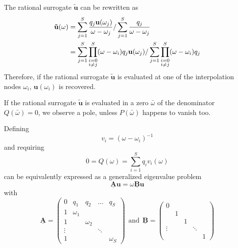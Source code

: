 \documentclass[11pt, a4paper]{article}
\begin{document}
The rational surrogate $\mathbf{\tilde{u}}$ can be rewritten as 
\begin{align}
    \mathbf{\tilde{u}}(\omega)
    &= \sum_{j=1}^S \frac{q_j \mathbf{u}(\omega_j)}{\omega - \omega_j}
    / \sum_{j=1}^S \frac{q_j}{\omega - \omega_j} \notag \\
    &= \sum_{j=1}^S \prod_{\substack{i=0 \\ i \neq j}}^S (\omega - \omega_i) q_j \mathbf{u}(\omega_j)
    / \sum_{j=1}^S \prod_{\substack{i=0 \\ i \neq j}}^S (\omega - \omega_i) q_j
\end{align}
Therefore, if the rational surrogate $\mathbf{\tilde{u}}$ is evaluated at one of the
interpolation nodes $\omega_i$, $\mathbf{u}(\omega_i)$ is recovered.

If the rational surrogate $\mathbf{\tilde{u}}$ is evaluated in a zero
$\bar{\omega}$ of the denominator $Q(\bar{\omega}) = 0$, we observe a pole,
unless $P(\bar{\omega})$ happens to vanish too.


\citep{klein}

Defining 
\begin{equation}
    v_i = (\omega - \omega_i)^{-1}
\end{equation}
and requiring
\begin{equation}
    0 = Q(\omega) = \sum_{i=1}^S q_i v_i(\omega)
\end{equation}
can be equivalently expressed as a generalized eigenvalue problem
\begin{equation}
    \mathbf{\underline{A}} \mathbf{u} = \omega \mathbf{\underline{B}} \mathbf{u}
\end{equation}
with
\begin{equation}
    \mathbf{\underline{A}} = \begin{pmatrix}
        0 & q_1 & q_2 & \dots & q_S \\
        1 & \omega_1 & & & \\
        1 & & \omega_2 & & \\ 
        \vdots & & & \ddots & \\ 
        1 & & & & \omega_S
    \end{pmatrix} ~~\text{and}~~
    \mathbf{\underline{B}} = \begin{pmatrix}
        0 & & & & \\
         & 1 & & & \\
         & & 1 & & \\ 
        \vdots & & & \ddots & \\ 
         & & & & 1
    \end{pmatrix}\label{equ:root-finding}
\end{equation}
\end{document}

